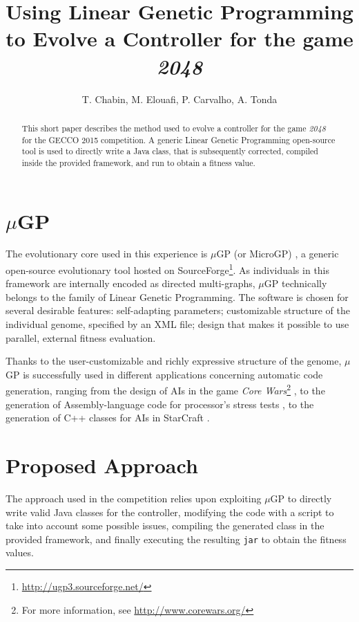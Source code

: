 \documentclass[11pt,twocolumn]{article}
\title{ \vspace{-4cm}Using Linear Genetic Programming\\to Evolve a Controller for the game \emph{2048}}
\author{T. Chabin, M. Elouafi, P. Carvalho, A. Tonda}
\begin{document}
\maketitle

\begin{abstract}

This short paper describes the method used to evolve a controller for the game \emph{2048} for the GECCO 2015 competition. A generic Linear Genetic Programming open-source tool is used to directly write a Java class, that is subsequently corrected, compiled inside the provided framework, and run to obtain a fitness value.



\end{abstract}

\vspace{-0.45cm}

\section{$\mu$GP}

The evolutionary core used in this experience is $\mu$GP (or MicroGP) \cite{Squillero2005}, a generic open-source evolutionary tool hosted on SourceForge\footnote{\url{http://ugp3.sourceforge.net/}}. As individuals in this framework are internally encoded as directed multi-graphs, $\mu$GP technically belongs to the family of Linear Genetic Programming. The software is chosen for several desirable features: self-adapting parameters; customizable structure of the individual genome, specified by an XML file; design that makes it possible to use parallel, external fitness evaluation.

Thanks to the user-customizable and richly expressive structure of the genome, $\mu$GP is successfully used in different applications concerning automatic code generation, ranging from the design of AIs in the game \emph{Core Wars}\footnote{For more information, see \url{http://www.corewars.org/}} \cite{Corno2005}, to the generation of Assembly-language code for processor's stress tests \cite{Corno2003}, %
to the generation of C++ classes for AIs in StarCraft \cite{Garcia2015}.

\section{Proposed Approach}

The approach used in the competition relies upon exploiting $\mu$GP to directly write valid Java classes for the controller, modifying the code with a script to take into account some possible issues, compiling the generated class in the provided framework, and finally executing the resulting \texttt{jar} to obtain the fitness values.
\end{document}
